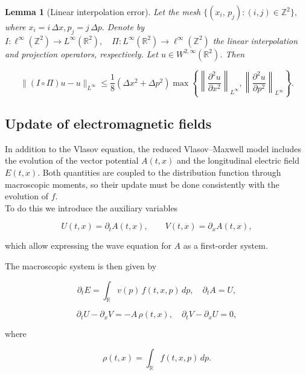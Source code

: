 \documentclass[11pt,a4paper,twoside,pdf]{article}
\numberwithin{equation}{section}
\newtheorem{lemma}[theorem]{Lemma}
\begin{document}
\begin{lemma}[Linear interpolation error]

Let the mesh $\{(x_i,\, p_j) : (i,j)\in \mathbb{Z}^2\},$ where $x_i = i\,\Delta x, p_j = j\,\Delta p.$ Denote by $I : \ell^\infty(\mathbb{Z}^2) \longrightarrow L^\infty(\mathbb{R}^2),
\quad
\Pi : L^\infty(\mathbb{R}^2) \longrightarrow \ell^\infty(\mathbb{Z}^2)$ the linear interpolation and projection operators, respectively. Let $u\in W^{2,\infty}(\mathbb{R}^2)$. Then


\[
\|(I\circ\Pi)u - u\|_{L^\infty}
\le \frac{1}{8}(\Delta x^2 + \Delta p^2)
\max\left\{
\left\|\frac{\partial^2 u}{\partial x^2}\right\|_{L^\infty},
\left\|\frac{\partial^2 u}{\partial p^2}\right\|_{L^\infty}
\right\}.
\]



\end{lemma}





\subsection{Update of electromagnetic fields}

In addition to the Vlasov equation, the reduced Vlasov--Maxwell model includes the evolution of the vector potential $A(t,x)$ and the longitudinal electric field $E(t,x)$. Both quantities are coupled to the distribution function through macroscopic moments, so their update must be done consistently with the evolution of $f$. \\

To do this we introduce the auxiliary variables


\[
U(t,x)=\partial_t A(t,x), \qquad V(t,x)=\partial_x A(t,x),
\]


which allow expressing the wave equation for $A$ as a first-order system.

The macroscopic system is then given by


\[
\partial_t E = \int_{\mathbb{R}} v(p)\,f(t,x,p)\,dp, \quad \partial_t A = U,
\]




\[
\partial_t U - \partial_x V = -A\,\rho(t,x), \quad
\partial_t V - \partial_x U = 0,
\]


where


\[
\rho(t,x)=\int_{\mathbb{R}} f(t,x,p)\,dp.
\]
\end{document}
